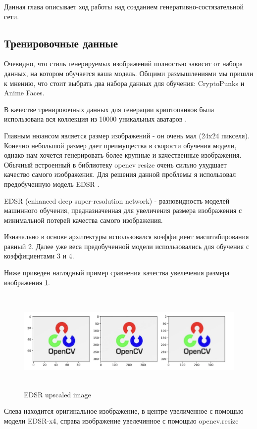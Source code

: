Данная глава описывает ход работы над созданием генеративно-состязательной сети.

\subsection{Тренировочные данные}

Очевидно, что стиль генерируемых изображений полностью зависит от набора данных, на котором обучается ваша модель. Общими размышлениями мы пришли к мнению, что стоит выбрать два набора данных для обучения: CryptoPunks и Anime Faces.

В качестве тренировочных данных для генерации криптопанков была использована вся коллекция из 10000 уникальных аватаров \cite{cryptopunks_dataset}.


Главным нюансом является размер изображений - он очень мал (24x24 пикселя). Конечно небольшой размер дает преимущества в скорости обучения модели, однако нам хочется генерировать более крупные и качественные изображения.
Обычный встроенный в библиотеку opencv resize очень сильно ухудшает качество самого изображения. Для решения данной проблемы я использовал предобученную модель EDSR \cite{EDSR}.

\begin{definition}
    EDSR (enhanced deep super-resolution network) - разновидность моделей машинного обучения, предназначенная для увеличения размера изображения с минимальной потерей качества самого изображения.
\end{definition}

Изначально в основе архитектуры использовался коэффициент масштабирования равный 2. Далее уже веса предобученной модели использовались для обучения с коэффициентами 3 и 4.

Ниже приведен наглядный пример сравнения качества увелечения размера изображения {\color{blue} \ref{fig.EDSR_difference}}.
\begin{figure}
    \centering
    \includegraphics[height=50mm]{fig/EDSR_difference.png}
    \caption{EDSR upscaled image}
    \label{fig.EDSR_difference}
\end{figure}
Слева находится оригинальное изображение, в центре увеличенное с помощью модели EDSR-x4, справа изображение увелечинное с помощью opencv.resize

